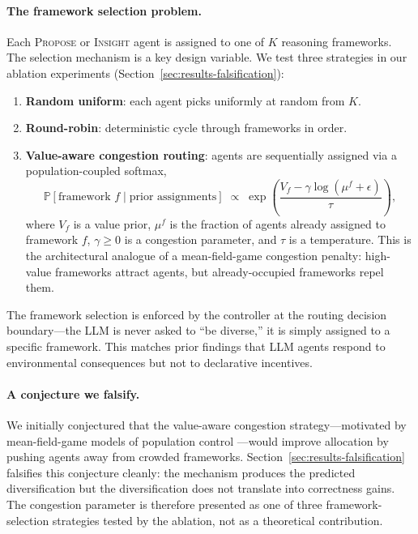 \documentclass[11pt]{amsart}
\newcommand{\e}{\epsilon}
\newcommand{\g}{\gamma}
\newcommand\1{{\mathds{1}}}
\newcommand\PP{{\mathbb{P}}}
\theoremstyle{definition}
\theoremstyle{remark}
\numberwithin{equation}{section}
\begin{document}
\paragraph{The framework selection problem.}
Each \textsc{Propose} or \textsc{Insight} agent is assigned to one of $K$ reasoning frameworks.
The selection mechanism is a key design variable.
We test three strategies in our ablation experiments (Section~\ref{sec:results-falsification}):
\begin{enumerate}[leftmargin=1.4em, itemsep=2pt]
\item \textbf{Random uniform}: each agent picks uniformly at random from $K$.
\item \textbf{Round-robin}: deterministic cycle through frameworks in order.
\item \textbf{Value-aware congestion routing}: agents are sequentially assigned via a population-coupled softmax,
\begin{equation}\label{eq:softmax}
\PP[\text{framework } f \mid \text{prior assignments}] \;\propto\; \exp\!\left(\frac{V_f - \g \log(\mu^f + \e)}{\tau}\right),
\end{equation}
where $V_f$ is a value prior, $\mu^f$ is the fraction of agents already assigned to framework $f$, $\g \ge 0$ is a congestion parameter, and $\tau$ is a temperature.
This is the architectural analogue of a mean-field-game congestion penalty: high-value frameworks attract agents, but already-occupied frameworks repel them.
\end{enumerate}
The framework selection is enforced by the controller at the routing decision boundary---the LLM is never asked to ``be diverse,'' it is simply assigned to a specific framework.
This matches prior findings that LLM agents respond to environmental consequences but not to declarative incentives.

\paragraph{A conjecture we falsify.}
We initially conjectured that the value-aware congestion strategy---motivated by mean-field-game models of population control \cite{LasryLions2007, HuangMalhameCaines2006, Gomes2010, Gueant2015}---would improve allocation by pushing agents away from crowded frameworks.
Section~\ref{sec:results-falsification} falsifies this conjecture cleanly: the mechanism produces the predicted diversification but the diversification does not translate into correctness gains.
The congestion parameter is therefore presented as one of three framework-selection strategies tested by the ablation, not as a theoretical contribution.
\end{document}
